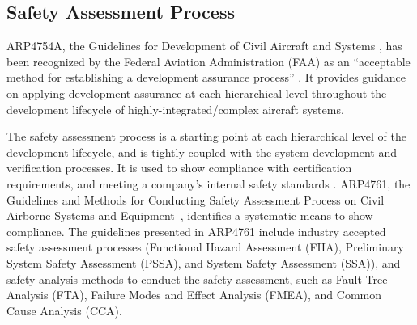 \subsection{Safety Assessment Process}
\label{subsec:process}

ARP4754A, the Guidelines for Development of Civil Aircraft and Systems \cite{SAE:ARP4754A}, has been recognized by the Federal Aviation Administration (FAA) as an ``acceptable method for establishing a development assurance process'' \cite{AC:20-174}. It provides guidance on applying development assurance at each hierarchical level throughout the development lifecycle of highly-integrated/complex aircraft systems.


The safety assessment process is a starting point at each hierarchical level of the development lifecycle, and is tightly coupled with the system development and verification processes. It is used to show compliance with certification requirements, and meeting a company's internal safety standards \cite{SAE:ARP4754A}. ARP4761, the Guidelines and Methods for Conducting Safety Assessment Process on Civil Airborne Systems and Equipment~\cite{SAE:ARP4761},  identifies a systematic means to show compliance. The guidelines presented in ARP4761 include industry accepted safety assessment processes (Functional Hazard Assessment (FHA), Preliminary System Safety Assessment (PSSA), and System Safety Assessment (SSA)), and safety analysis methods to conduct the safety assessment, 
such as Fault Tree Analysis (FTA), Failure Modes and Effect Analysis (FMEA), and Common Cause Analysis (CCA).


